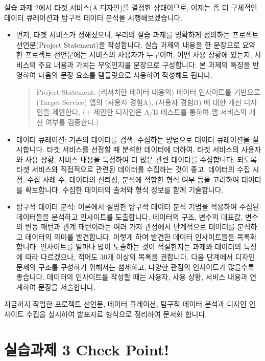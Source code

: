 \documentclass[
  letterpaper,
]{book}
\begin{document}
실습 과제 2에서 타겟 서비스(A 디자인)를 결정한 상태이므로, 이제는 좀 더
구체적인 데이터 큐레이션과 탐구적 데이터 분석을 시행해보겠습니다.

\begin{itemize}
\item
  먼저, 타겟 서비스가 정해졌으니, 우리의 실습 과제를 명확하게 정의하는
  프로젝트 선언문(Project Statement)을 작성합니다. 실습 과제의 내용을 한
  문장으로 요약한 프로젝트 선언문에는 서비스의 사용자가 누구이며, 어떤
  사용 상황에 있는지, 서비스의 주요 내용과 가치는 무엇인지를 문장으로
  구성합니다. 본 과제의 특징을 반영하여 다음의 문장 요소를 템플릿으로
  사용하여 작성해도 됩니다.

  \begin{quote}
  Project Statement: (리서치한 데이터 내용의) 데이터 인사이트를 기반으로
  (Target Service) 앱의 (사용자 경험A), (사용자 경험B) 에 대한 개선
  디자인을 제안한다. (+ 제안한 디자인은 A/B 테스트를 통하여 앱 서비스의
  개선 여부를 검증한다.)
  \end{quote}
\item
  데이터 큐레이션: 기존의 데이터를 검색, 수집하는 방법으로 데이터
  큐레이션을 실시합니다. 타겟 서비스를 선정할 때 분석한 데이터에 더하여,
  타겟 서비스의 사용자와 사용 상황, 서비스 내용을 특정하여 더 많은 관련
  데이터를 수집합니다. 되도록 타겟 서비스와 직접적으로 관련된 데이터를
  수집하는 것이 좋고, 데이터의 수집 시점, 수집 사례 수, 데이터의 신뢰성,
  분석에 적합한 형식 여부 등을 고려하여 데이터를 확보합니다. 수집한
  데이터의 출처와 형식 정보를 함께 기술합니다.
\item
  탐구적 데이터 분석: 이론에서 설명한 탐구적 데이터 분석 기법을 적용하여
  수집된 데이터들을 분석하고 인사이트를 도출합니다. 데이터의 구조,
  변수의 대표값, 변수의 변동 패턴과 관계 패턴이라는 여러 가지 관점에서
  단계적으로 데이터를 분석하고 데이터의 의미를 발견합니다. 이렇게 하여
  발견한 데이터 인사이트들을 목록화 합니다. 인사이트를 얼마나 많이
  도출하는 것이 적절한지는 과제와 데이터의 특징에 따라 다르겠으나,
  적어도 30개 이상의 목록을 권합니다. 다음 단계에서 디자인 문제의 구조를
  구성하기 위해서는 섬세하고, 다양한 관점의 인사이트가 많을수록
  좋습니다. 데이터의 인사이트를 작성할 때는 사용자, 사용 상황, 서비스
  내용과 연계하여 문장을 서술합니다.
\end{itemize}

지금까지 작업한 프로젝트 선언문, 데이터 큐레이션, 탐구적 데이터 분석과
디자인 인사이트 수집을 실시하여 발표자료 형식으로 정리하여 문서화
합니다.

\section{실습과제 3 Check
Point!}\label{uxc2e4uxc2b5uxacfcuxc81c-3-check-point}
\end{document}

